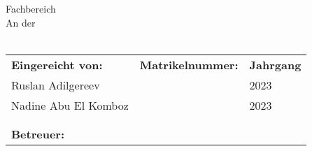 \begin{titlepage}

	\thispagestyle{plain}

	\begin{figure}[H]
	\begin{flushright}
	\end{flushright}
	\end{figure}
	\vspace{-5pt}
	\begin{center}
		\vspace{2cm}
		\begin{LARGE}
			\art
			\\
			\vspace{16pt}
		\end{LARGE}
		\begin{Huge}
			\titel
			\\		
			\vspace{14pt}
		\end{Huge}
		\begin{LARGE}
			\untertitel	
		\end{LARGE}
	\end{center}

	\begin{center}
		Fachbereich \studienfach\\
		
		An der \hochschule \\ \campus\\
	\end{center}

	\let\stretchbuffer\arraystretch %
	\renewcommand{\arraystretch}{1} %
	\begin{table}[b!]
		\normalsize
		\begin{tabularx}{\textwidth}{lXX}
			\textbf{Eingereicht von:} 				& \textbf{Matrikelnummer:}	& \textbf{Jahrgang} \\
			Ruslan Adilgereev 						& \matrikelnr				& 2023 \\
			Nadine Abu El Komboz					& \matrikelnr				& 2023 \\
			\autor 									& \matrikelnr				& \jahrgang \\

			\\[1cm]
			\textbf{Betreuer:} 	& \gutachter & \\
		\end{tabularx}
	\end{table}
	\renewcommand{\arraystretch}{\stretchbuffer} %
	\clearpage
\end{titlepage}

